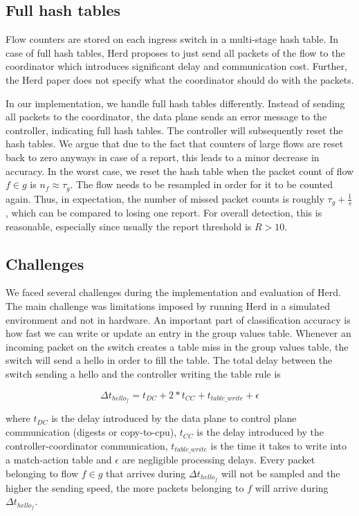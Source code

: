 \documentclass[11pt,oneside,a4paper]{article}
\begin{document}
\subsection{Full hash tables} \label{special}

Flow counters are stored on each ingress switch in a multi-stage hash table. In case of full hash tables, Herd proposes to just send all packets of the flow to the coordinator which introduces significant delay and communication cost. Further, the Herd paper does not specify what the coordinator should do with the packets.

In our implementation, we handle full hash tables differently. Instead of sending all packets to the coordinator, the data plane sends an error message to the controller, indicating full hash tables. The controller will subsequently reset the hash tables. We argue that due to the fact that counters of large flows are reset back to zero anyways in case of a report, this leads to a minor decrease in accuracy. In the worst case, we reset the hash table when the packet count of flow $f \in g$ is $n_f \approx \tau_g$. The flow needs to be resampled in order for it to be counted again. Thus, in expectation, the number of missed packet counts is roughly $\tau_g+\frac{1}{s}$, which can be compared to losing one report. For overall detection, this is reasonable, especially since usually the report threshold is $R > 10$.

\subsection{Challenges} \label{challenges}

We faced several challenges during the implementation and evaluation of Herd. The main challenge was limitations imposed by running Herd in a simulated environment and not in hardware. An important part of classification accuracy is how fast we can write or update an entry in the group values table. Whenever an incoming packet on the switch creates a table miss in the group values table, the switch will send a hello in order to fill the table. The total delay between the switch sending a hello and the controller writing the table rule is

$$\Delta t_{hello_f} = t_{DC} + 2*t_{CC} + t_{table\_write} + \epsilon$$

\noindent where $t_{DC}$ is the delay introduced by the data plane to control plane communication (digests or copy-to-cpu), $t_{CC}$ is the delay introduced by the controller-coordinator communication, $t_{table\_write}$ is the time it takes to write into a match-action table and $\epsilon$ are negligible processing delays. Every packet belonging to flow $f \in g$ that arrives during $\Delta t_{hello_f}$ will not be sampled and the higher the sending speed, the more packets belonging to $f$ will arrive during $\Delta t_{hello_f}$. 
\end{document}
